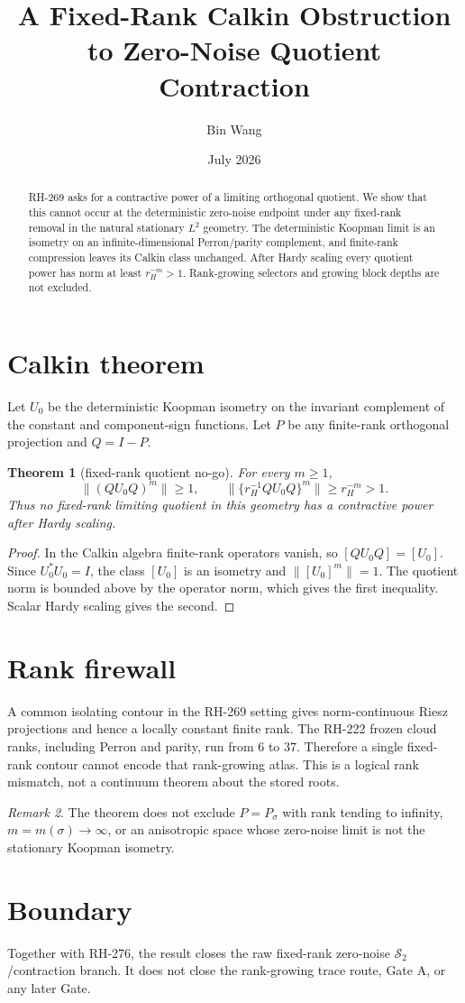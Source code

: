 \documentclass[11pt]{article}
\title{A Fixed-Rank Calkin Obstruction to Zero-Noise Quotient Contraction}\author{Bin Wang}\date{July 2026}
\newtheorem{theorem}{Theorem}[section]\theoremstyle{remark}\newtheorem{remark}[theorem]{Remark}
\begin{document}
\maketitle
\begin{abstract}
RH-269 asks for a contractive power of a limiting orthogonal quotient.  We
show that this cannot occur at the deterministic zero-noise endpoint under
any fixed-rank removal in the natural stationary $L^2$ geometry.  The
deterministic Koopman limit is an isometry on an infinite-dimensional
Perron/parity complement, and finite-rank compression leaves its Calkin class
unchanged.  After Hardy scaling every quotient power has norm at least
$r_H^{-m}>1$.  Rank-growing selectors and growing block depths are not
excluded.
\end{abstract}
\section{Calkin theorem}
Let $U_0$ be the deterministic Koopman isometry on the invariant complement
of the constant and component-sign functions.  Let $P$ be any finite-rank
orthogonal projection and $Q=I-P$.
\begin{theorem}[fixed-rank quotient no-go]
For every $m\ge1$,
\[
 \|(QU_0Q)^m\|\ge1,
 \qquad
 \|\{r_H^{-1}QU_0Q\}^m\|\ge r_H^{-m}>1.
\]
Thus no fixed-rank limiting quotient in this geometry has a contractive
power after Hardy scaling.
\end{theorem}
\begin{proof}
In the Calkin algebra finite-rank operators vanish, so
$[QU_0Q]=[U_0]$.  Since $U_0^*U_0=I$, the class $[U_0]$ is an isometry and
$\|[U_0]^m\|=1$.  The quotient norm is bounded above by the operator norm,
which gives the first inequality.  Scalar Hardy scaling gives the second.
\end{proof}
\section{Rank firewall}
A common isolating contour in the RH-269 setting gives norm-continuous Riesz
projections and hence a locally constant finite rank.  The RH-222 frozen
cloud ranks, including Perron and parity, run from $6$ to $37$.  Therefore a
single fixed-rank contour cannot encode that rank-growing atlas.  This is a
logical rank mismatch, not a continuum theorem about the stored roots.
\begin{remark}
The theorem does not exclude $P=P_\sigma$ with rank tending to infinity,
$m=m(\sigma)\to\infty$, or an anisotropic space whose zero-noise limit is not
the stationary Koopman isometry.
\end{remark}
\section{Boundary}
Together with RH-276, the result closes the raw fixed-rank zero-noise
$\mathcal S_2$/contraction branch.  It does not close the rank-growing trace
route, Gate A, or any later Gate.
\end{document}
